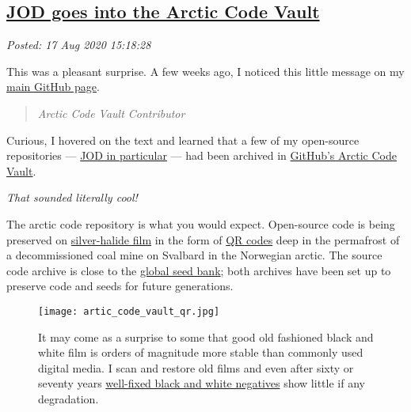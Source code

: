%

\subsection*{\href{http://analyzethedatanotthedrivel.org/2020/08/17/jod-goes-into-the-arctic-code-vault/}{JOD goes into the Arctic Code Vault}}


\noindent\emph{Posted: 17 Aug 2020 15:18:28}
\vspace{6pt}

This was a pleasant surprise. A few weeks ago, I noticed this little
message on my \href{https://github.com/bakerjd99}{main GitHub page}.

\begin{quote}
\emph{Arctic Code Vault Contributor}
\end{quote}

Curious, I hovered on the text and learned that a few of my open-source
repositories --- \href{https://github.com/bakerjd99/jod}{JOD in
particular} --- had been archived in
\href{https://github.blog/2020-07-16-github-archive-program-the-journey-of-the-worlds-open-source-code-to-the-arctic/}{GitHub's
Arctic Code Vault}.

\emph{That sounded literally cool!}

The arctic code repository is what you would expect. Open-source code is
being preserved on
\href{https://www.piql.com/githubs-code-now-stored-forever-on-piqlfilm/}{silver-halide
film} in the form of \href{https://en.wikipedia.org/wiki/QR_code}{QR
codes} deep in the permafrost of a decommissioned coal mine on Svalbard
in the Norwegian arctic. The source code archive is close to the
\href{https://www.seedvault.no/}{global seed bank}; both archives have
been set up to preserve code and seeds for future generations.

\captionsetup[figure]{labelformat=empty}
\begin{SCfigure}
\centering
\texttt{[image: artic\_code\_vault\_qr.jpg]}
\caption[It may come as a surprise to some that good old fashioned black
and white film is orders of magnitude more stable than digital media]{It may come as a surprise to some that good old fashioned black
and white film is orders of magnitude more stable than commonly used
digital media. I scan and restore old films and even after sixty or
seventy years
\href{http://www.film-photography-blog.com/film-processing-chemistry-how-does-it-work/}{well-fixed
black and white negatives} show little if any degradation.}
\label{fig:6083x0}
\end{SCfigure}

